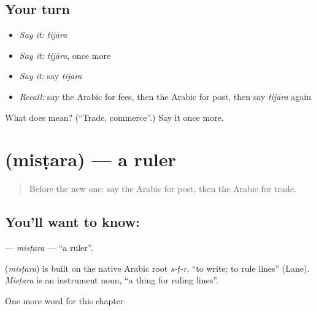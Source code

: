 \subsection*{Your turn}
\begin{itemize}
\raggedright
  \item \emph{Say it:} \emph{tijāra}
  \item \emph{Say it:} \emph{tijāra}, once more
  \item \emph{Say it:} say \emph{tijāra}
  \item \emph{Recall:} say the Arabic for fees, then the Arabic for post, then say \emph{tijāra} again
\end{itemize}

\begin{tcolorbox}[breakable,colback=teal!4,colframe=teal!35!black,title={Before you move on}]
What does  mean? (\textquotedblleft{}Trade, commerce\textquotedblright{}.) Say it once more.
\end{tcolorbox}
\section[\texorpdfstring{\ar{مسطرة} (misṭara)}{مسطرة (misṭara)}]{ (misṭara) — a ruler}

\label{lesson:AR-C253-mistara}



\begin{quote}
Before the new one: say the Arabic for post, then the Arabic for trade.
\end{quote}

\subsection*{You'll want to know: }
\textbf{} — \emph{misṭara} — \textquotedblleft{}a ruler\textquotedblright{}.

\begin{cousinweb}
\textbf{} (\emph{misṭara}) is built on the native Arabic root \emph{s-ṭ-r}, \textquotedblleft{}to write; to rule lines\textquotedblright{} (Lane). \emph{Misṭara} is an instrument noun, \textquotedblleft{}a thing for ruling lines\textquotedblright{}.
\end{cousinweb}

\begin{grammarlens}[title={What you've built}]
One more word for this chapter.
\end{grammarlens}

